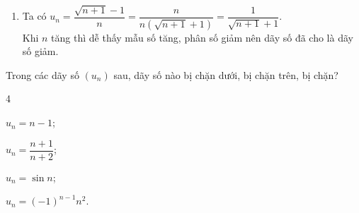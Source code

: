 \begin{ex}
{\begin{enumerate}
			Khi  đó $u_{n+1}-u_n=3 n-2+\dfrac{6}{n+2}-\left(3 n-5+\dfrac{6}{n+1}\right)=3-\dfrac{6}{(n+1)(n+2)}$.\\
			Với $n  \in \mathbb{N}^*$, ta có
			 \allowdisplaybreaks
			\begin{eqnarray*}
				(n+1)(n+2) \geq 6 &\Leftrightarrow& \dfrac{6}{(n+1)(n+2)} \leq 1  \\
				&\Leftrightarrow& 3-\dfrac{6}{(n+1)(n+2)} \geq  2\\
				 &\Rightarrow& u_{n+1}>u_n.
			\end{eqnarray*}
			$\Rightarrow\left(u_n\right)$  là dãy số tăng.
			\item Ta có $u_n=\dfrac{\sqrt{n+1}-1}{n}=\dfrac{n}{n(\sqrt{n+1}+1)}=\dfrac{1}{\sqrt{n+1}+1}$.\\ 
			Khi $n$ tăng thì dễ  thấy mẫu số tăng, phân số giảm nên dãy số đã cho là dãy số giảm.
		\end{enumerate}
	} 
\end{ex}

\begin{bt}%
	Trong các dãy số $(u_n)$ sau, dãy số nào bị chặn  dưới, bị chặn trên, bị chặn?
	\begin{enumEX}[a)]{4}
		\item  $u_n=n-1$;
		 \item $u_n=\dfrac{n+1}{n+2}$;
		\item $u_n=\sin  n$;
		 \item $u_n=(-1)^{n-1} n^2$.
	\end{enumEX}
\end{bt}

